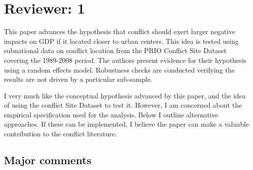 
\section{Reviewer: 1}

This paper advances the hypothesis that conflict should exert larger negative impacts on GDP if it located closer to urban centers. This idea is tested using subnational data on conflict location from the PRIO Conflict Site Dataset covering the 1989-2008 period. The authors present evidence for their hypothesis using a random effects model. Robustness checks are conducted verifying the results are not driven by a particular sub-sample.

I very much like the conceptual hypothesis advanced by this paper, and the idea of using the conflict Site Dataset to test it. However, I am concerned about the empirical specification used for the analysis. Below I outline alternative approaches. If these can be implemented, I believe the paper can make a valuable contribution to the conflict literature.

\subsection{Major comments}

